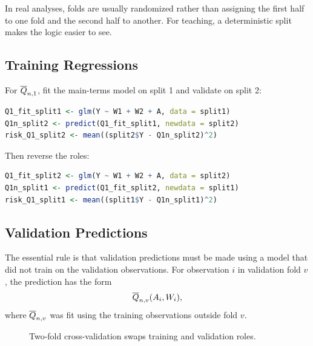In real analyses, folds are usually randomized rather than assigning the first half to
one fold and the second half to another. For teaching, a deterministic split makes the
logic easier to see.

\subsection{Training Regressions}

For $\overline{Q}_{n,1}$, fit the main-terms model on split 1 and validate on split 2:

\begin{implementationbox}
\begin{lstlisting}[language=R]
Q1_fit_split1 <- glm(Y ~ W1 + W2 + A, data = split1)
Q1n_split2 <- predict(Q1_fit_split1, newdata = split2)
risk_Q1_split2 <- mean((split2$Y - Q1n_split2)^2)
\end{lstlisting}
\end{implementationbox}

Then reverse the roles:

\begin{implementationbox}
\begin{lstlisting}[language=R]
Q1_fit_split2 <- glm(Y ~ W1 + W2 + A, data = split2)
Q1n_split1 <- predict(Q1_fit_split2, newdata = split1)
risk_Q1_split1 <- mean((split1$Y - Q1n_split1)^2)
\end{lstlisting}
\end{implementationbox}

\subsection{Validation Predictions}

The essential rule is that validation predictions must be made using a model that did
not train on the validation observations. For observation $i$ in validation fold $v$,
the prediction has the form
\[
\overline{Q}_{n,v}(A_i,W_i),
\]
where $\overline{Q}_{n,v}$ was fit using the training observations outside fold $v$.

\begin{figure}[H]
\centering
{}
\caption{Two-fold cross-validation swaps training and validation roles.}
\label{fig:ch6-twofold}
\end{figure}


